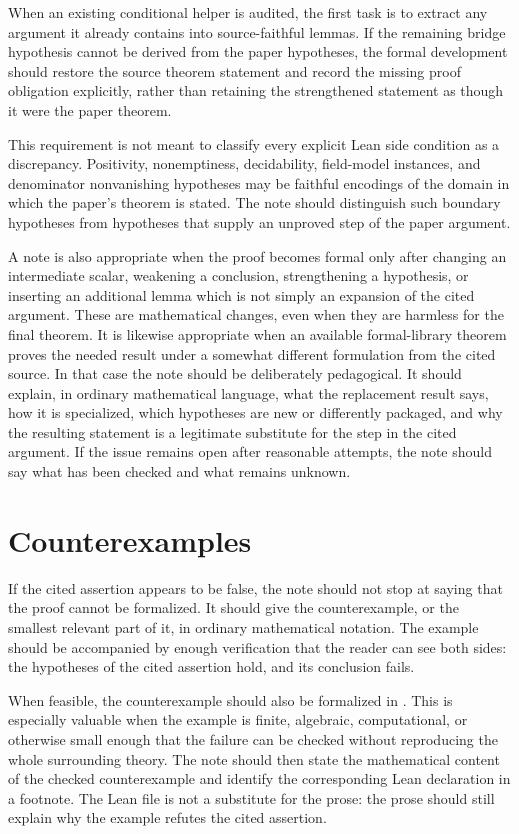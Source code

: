 \documentclass[11pt]{article}
\begin{document}
When an existing conditional helper is audited, the first task is to extract any
argument it already contains into source-faithful lemmas.  If the remaining
bridge hypothesis cannot be derived from the paper hypotheses, the formal
development should restore the source theorem statement and record the missing
proof obligation explicitly, rather than retaining the strengthened statement as
though it were the paper theorem.

This requirement is not meant to classify every explicit Lean side condition as
a discrepancy.  Positivity, nonemptiness, decidability, field-model instances,
and denominator nonvanishing hypotheses may be faithful encodings of the domain
in which the paper's theorem is stated.  The note should distinguish such
boundary hypotheses from hypotheses that supply an unproved step of the paper
argument.

A note is also appropriate when the proof becomes formal only after changing an
intermediate scalar, weakening a conclusion, strengthening a hypothesis, or
inserting an additional lemma which is not simply an expansion of the cited
argument.  These are mathematical changes, even when they are harmless for the
final theorem.  It is likewise appropriate when an available formal-library
theorem proves the needed result under a somewhat different formulation from the
cited source.  In that case the note should be deliberately pedagogical.  It
should explain, in ordinary mathematical language, what the replacement result
says, how it is specialized, which hypotheses are new or differently packaged,
and why the resulting statement is a legitimate substitute for the step in the
cited argument.  If the issue remains open after reasonable attempts, the note
should say what has been checked and what remains unknown.

\section{Counterexamples}

If the cited assertion appears to be false, the note should not stop at saying
that the proof cannot be formalized.  It should give the counterexample, or the
smallest relevant part of it, in ordinary mathematical notation.  The example
should be accompanied by enough verification that the reader can see both sides:
the hypotheses of the cited assertion hold, and its conclusion fails.

When feasible, the counterexample should also be formalized in \Lean{}.  This is
especially valuable when the example is finite, algebraic, computational, or
otherwise small enough that the failure can be checked without reproducing the
whole surrounding theory.  The note should then state the mathematical content
of the checked counterexample and identify the corresponding Lean declaration in
a footnote.  The Lean file is not a substitute for the prose: the prose should
still explain why the example refutes the cited assertion.
\end{document}
